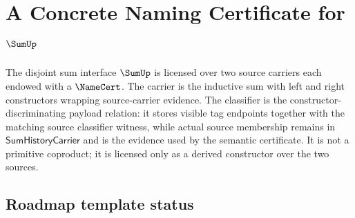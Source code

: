 \chapter{A Concrete Naming Certificate for \(\SumUp\)}
\label{ch:concrete-instances-sum-namecert}

The disjoint sum interface \(\SumUp\) is licensed over two source carriers each endowed with a \(\NameCert\). The carrier is the inductive sum with left and right constructors wrapping source-carrier evidence. The classifier is the constructor-discriminating payload relation: it stores visible tag endpoints together with the matching source classifier witness, while actual source membership remains in $\mathsf{SumHistoryCarrier}$ and is the evidence used by the semantic certificate. It is not a primitive coproduct; it is licensed only as a derived constructor over the two sources.

\section{Roadmap template status}

